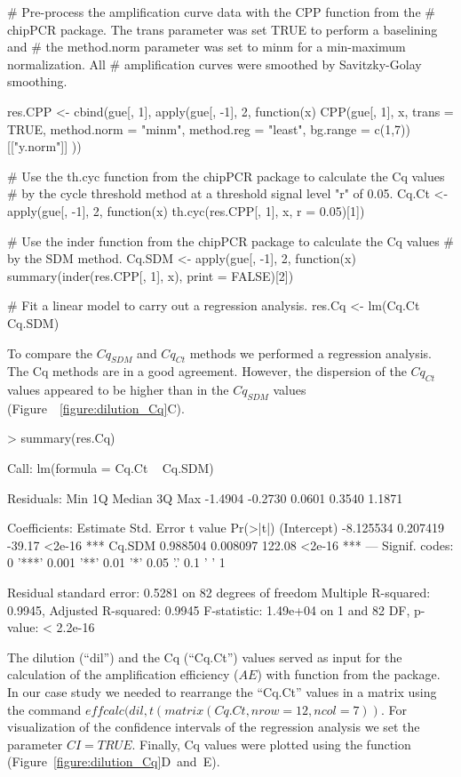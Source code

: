 \begin{example}
# Pre-process the amplification curve data with the CPP function from the 
# chipPCR package. The trans parameter was set TRUE to perform a baselining and 
# the method.norm parameter was set to minm for a min-maximum normalization. All
# amplification curves were smoothed by Savitzky-Golay smoothing.

res.CPP <- cbind(gue[, 1], apply(gue[, -1], 2, function(x) {
  CPP(gue[, 1], x, trans = TRUE, method.norm = "minm", method.reg = "least",
      bg.range = c(1,7))[["y.norm"]]
}))

# Use the th.cyc function from the chipPCR package to calculate the Cq values
# by the cycle threshold method at a threshold signal level "r" of 0.05.
Cq.Ct <- apply(gue[, -1], 2, function(x) 
  th.cyc(res.CPP[, 1], x, r = 0.05)[1])

# Use the inder function from the chipPCR package to calculate the Cq values
# by the SDM method.
Cq.SDM <- apply(gue[, -1], 2, function(x)
  summary(inder(res.CPP[, 1], x), print = FALSE)[2])

# Fit a linear model to carry out a regression analysis.
res.Cq <- lm(Cq.Ct ~ Cq.SDM)
\end{example}

To compare the $Cq_{SDM}$ and $Cq_{Ct}$ methods we performed a regression 
analysis. The Cq methods are in a good agreement. However, the dispersion of 
the 
$Cq_{Ct}$ values appeared to be higher than in the $Cq_{SDM}$ values 
(Figure~~\ref{figure:dilution_Cq}C).

\begin{example}
> summary(res.Cq)

Call:
lm(formula = Cq.Ct ~ Cq.SDM)

Residuals:
    Min      1Q  Median      3Q     Max 
-1.4904 -0.2730  0.0601  0.3540  1.1871 

Coefficients:
             Estimate Std. Error t value Pr(>|t|)    
(Intercept) -8.125534   0.207419  -39.17   <2e-16 ***
Cq.SDM       0.988504   0.008097  122.08   <2e-16 ***
---
Signif. codes:  0 '***' 0.001 '**' 0.01 '*' 0.05 '.' 0.1 ' ' 1

Residual standard error: 0.5281 on 82 degrees of freedom
Multiple R-squared:  0.9945,  Adjusted R-squared:  0.9945 
F-statistic: 1.49e+04 on 1 and 82 DF,  p-value: < 2.2e-16
\end{example}

The dilution (``dil'') and the Cq (``Cq.Ct'') values served as input for the 
calculation of the amplification efficiency ($AE$) with  function 
from the  package. In our case study we needed to rearrange 
the 
``Cq.Ct'' values in a matrix using the command $effcalc(dil, t(matrix(Cq.Ct, 
nrow = 12, ncol = 7))$. For visualization of the confidence intervals of the 
regression analysis we set the parameter $CI = TRUE$. Finally, Cq values were 
plotted 
using the  function (Figure~\ref{figure:dilution_Cq}D~and~E).


